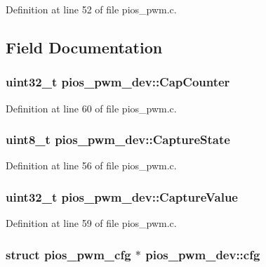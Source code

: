 \-Definition at line 52 of file pios\-\_\-pwm.\-c.



\subsection{\-Field \-Documentation}
\hypertarget{structpios__pwm__dev_aef85196929d283f9a4925ebd3b353b5f}{
\subsubsection[{\-Cap\-Counter}]{\setlength{\rightskip}{0pt plus 5cm}uint32\-\_\-t {\bf pios\-\_\-pwm\-\_\-dev\-::\-Cap\-Counter}}}\label{structpios__pwm__dev_aef85196929d283f9a4925ebd3b353b5f}


\-Definition at line 60 of file pios\-\_\-pwm.\-c.

\hypertarget{structpios__pwm__dev_a31387dc44557e705dc17b4a12313b6a5}{
\subsubsection[{\-Capture\-State}]{\setlength{\rightskip}{0pt plus 5cm}uint8\-\_\-t {\bf pios\-\_\-pwm\-\_\-dev\-::\-Capture\-State}}}\label{structpios__pwm__dev_a31387dc44557e705dc17b4a12313b6a5}


\-Definition at line 56 of file pios\-\_\-pwm.\-c.

\hypertarget{structpios__pwm__dev_a4636d6e2c328194059cdaecd349b117a}{
\subsubsection[{\-Capture\-Value}]{\setlength{\rightskip}{0pt plus 5cm}uint32\-\_\-t {\bf pios\-\_\-pwm\-\_\-dev\-::\-Capture\-Value}}}\label{structpios__pwm__dev_a4636d6e2c328194059cdaecd349b117a}


\-Definition at line 59 of file pios\-\_\-pwm.\-c.

\hypertarget{structpios__pwm__dev_a879902a1111b771fe171269e1db3a537}{
\subsubsection[{cfg}]{\setlength{\rightskip}{0pt plus 5cm}struct {\bf pios\-\_\-pwm\-\_\-cfg} $\ast$ {\bf pios\-\_\-pwm\-\_\-dev\-::cfg}}}\label{structpios__pwm__dev_a879902a1111b771fe171269e1db3a537}


